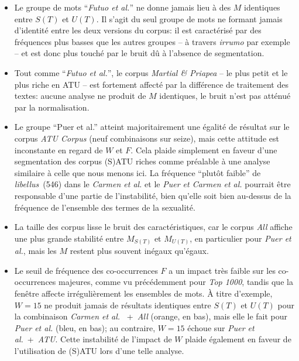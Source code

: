  \begin{itemize}
    \item Le groupe de mots ``\textit{Futuo et al.}'' ne donne jamais lieu à des $M$ identiques entre $S(T)$ et $U(T)$. Il s'agit du seul groupe de mots ne formant jamais d'identité entre les deux versions du corpus: il est caractérisé par des fréquences plus basses que les autres groupes -- à travers \textit{irrumo} par exemple -- et est donc plus touché par le bruit dû à l'absence de segmentation.
    \item Tout comme ``\textit{Futuo et al.}'', le corpus \textit{Martial \& Priapea} -- le plus petit et le plus riche en ATU -- est fortement affecté par la différence de traitement des textes: aucune analyse ne produit de $M$ identiques, le bruit n'est pas atténué par la normalisation.
    \item Le groupe ``Puer et al.'' atteint majoritairement une égalité de résultat sur le corpus \textit{ATU Corpus} (neuf combinaisons sur seize), mais cette attitude est inconstante en regard de $W$ et $F$. Cela plaide simplement en faveur d'une segmentation des corpus (S)ATU riches comme préalable à une analyse similaire à celle que nous menons ici. La fréquence ``plutôt faible'' de \textit{libellus}~(546) dans le \textit{Carmen et al.} et le \textit{Puer et Carmen et al.} pourrait être responsable d'une partie de l'instabilité, bien qu'elle soit bien au-dessus de la fréquence de l'ensemble des termes  de la sexualité.
    \item La taille des corpus lisse le bruit des caractéristiques, car le corpus \textit{All} affiche une plus grande stabilité entre $M_{S(T)}$ et $M_{U(T)}$, en particulier pour \textit{Puer et al.}, mais les $M$ restent plus souvent inégaux qu'égaux.
    \item Le seuil de fréquence des co-occurrences $F$ a un impact très faible sur les co-occurrences majeures, comme vu précédemment pour \textit{Top 1000}, tandis que la fenêtre affecte irrégulièrement les ensembles de mots. À titre d'exemple, $W=15$ ne produit jamais de résultats identiques entre $S(T)$ et $U(T)$ pour la combinaison \textit{Carmen et al. }~+~\textit{All} (orange, en bas), mais elle le fait pour  \textit{Puer et al.} (bleu, en bas); au contraire, $W=15$ échoue sur \textit{Puer et al.}~+~\textit{ATU}. Cette instabilité de l'impact de $W$ plaide également en faveur de l'utilisation de (S)ATU lors d'une telle analyse.
\end{itemize}

